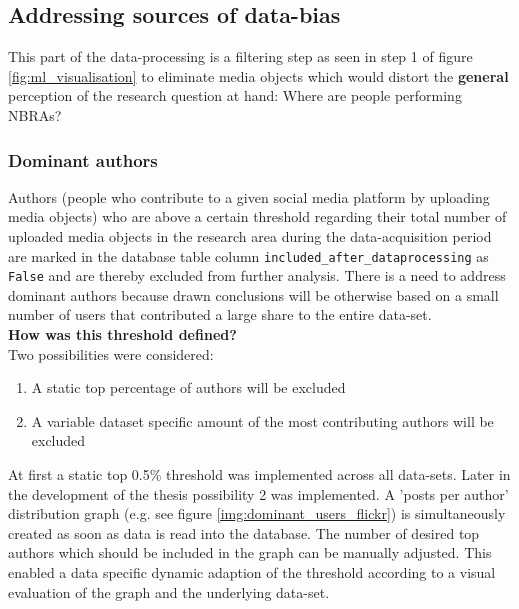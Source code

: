\subsection{Addressing sources of data-bias} \label{sources_data_bias}
This part of the data-processing is a filtering step as seen in step 1 of figure \ref{fig:ml_visualisation} to eliminate media objects which would distort the \textbf{general} perception of the research question at hand: Where are people performing NBRAs?

\subsubsection*{Dominant authors} \label{bias_dominant_authors}
Authors (people who contribute to a given social media platform by uploading media objects) who are above a certain threshold regarding their total number of uploaded media objects in the research area during the data-acquisition period are marked in the database table column \texttt{included\_after\_dataprocessing} as \texttt{False} and are thereby excluded from further analysis. There is a need to address dominant authors because drawn conclusions will be otherwise based on a small number of users that contributed a large share to the entire data-set.\\
\newline
\textbf{How was this threshold defined?}\\
\newline
Two possibilities were considered:
\begin{enumerate}
  \item A static top percentage of authors will be excluded
  \item A variable dataset specific amount of the most contributing authors will be excluded
\end{enumerate}

At first a static top 0.5\% threshold was implemented across all data-sets. Later in the development of the thesis possibility 2 was implemented. A 'posts per author' distribution graph (e.g. see figure \ref{img:dominant_users_flickr}) is simultaneously created as soon as data is read into the database. The number of desired top authors which should be included in the graph can be manually adjusted. This enabled a data specific dynamic adaption of the threshold according to a visual evaluation of the graph and the underlying data-set. 

